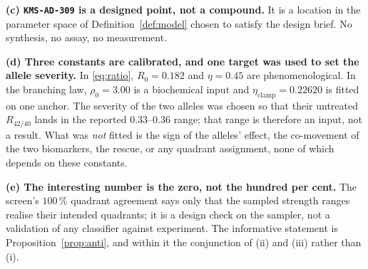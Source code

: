 \documentclass[11pt,reqno]{amsart}
\theoremstyle{plain}
\theoremstyle{definition}
\theoremstyle{remark}
\numberwithin{equation}{section}
\newcommand{\lead}{\texttt{KMS-AD-309}}
\begin{document}
\textbf{(c) \lead{} is a designed point, not a compound.} It is a location in the parameter space of Definition~\ref{def:model} chosen to satisfy the design brief. No synthesis, no assay, no measurement.

\textbf{(d) Three constants are calibrated, and one target was used to set the allele severity.} In \eqref{eq:ratio}, $R_0=0.182$ and $\eta=0.45$ are phenomenological. In the branching law, $\rho_0=3.00$ is a biochemical input and $\eta_{\mathrm{clamp}}=0.22620$ is fitted on one anchor. The severity of the two alleles was chosen so that their untreated $R_{42/40}$ lands in the reported $0.33$--$0.36$ range; that range is therefore an input, not a result. What was \emph{not} fitted is the sign of the alleles' effect, the co-movement of the two biomarkers, the rescue, or any quadrant assignment, none of which depends on these constants.

\textbf{(e) The interesting number is the zero, not the hundred per cent.} The screen's $100\,\%$ quadrant agreement says only that the sampled strength ranges realise their intended quadrants; it is a design check on the sampler, not a validation of any classifier against experiment. The informative statement is Proposition~\ref{prop:anti}, and within it the conjunction of (ii) and (iii) rather than (i).
\end{document}
